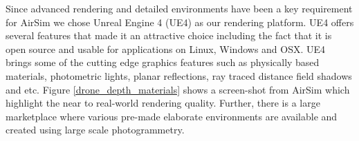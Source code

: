 \documentclass[graybox]{svmult}
\newcommand{\Name}{AirSim\xspace}
\begin{document}
Since advanced rendering and detailed environments have been a key requirement for \Name we chose Unreal Engine 4 (UE4) \cite{karis2013real} as our rendering platform. UE4 offers several features that made it an attractive choice including the fact that it is open source and usable for applications on Linux, Windows and OSX. UE4 brings some of the cutting edge graphics features such as physically based materials, photometric lights, planar reflections, ray traced distance field shadows and etc. Figure \ref{drone_depth_materials} shows a screen-shot from \Name which highlight the near to real-world rendering quality. Further, there is a large marketplace \cite{ue4marketplace} where various pre-made elaborate environments are available and created using large scale photogrammetry.

\end{document}
